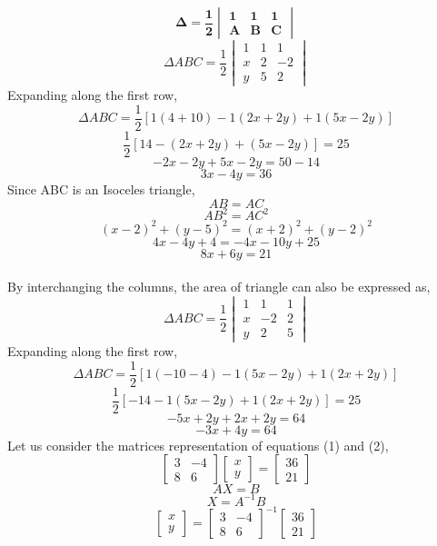 \documentclass[journal,12pt,twocolumn]{IEEEtran}
\begin{document}
$$ \label{eq:area_tri}
\mathbf{\Delta = \frac{1}{2}\begin{vmatrix}
1 & 1 & 1\\ 
A & B & C
\end{vmatrix}}$$
$$\Delta ABC=\frac{1}{2}\begin{vmatrix}
1 & 1 & 1\\ 
x & 2 & -2\\ 
y & 5 & 2
\end{vmatrix}$$
Expanding along the first row,\\
$$\Delta ABC=\frac{1}{2}\left [ 1(4+10)-1(2x+2y)+1(5x-2y) \right ]$$
$$\frac{1}{2}\left [14-(2x+2y)+(5x-2y) \right ]=25$$
$$-2x-2y+5x-2y=50-14$$
\begin{equation}
 3x-4y=36    
\end{equation}
\noindent
Since ABC is an Isoceles triangle,
$$AB=AC$$
$$AB^2=AC^2$$
$$(x-2)^2+(y-5)^2=(x+2)^2+(y-2)^2$$
$$4x-4y+4=-4x-10y+25$$
\begin{equation}
    {8x+6y=21}
\end{equation}\\
By interchanging the columns, the area of triangle can also be expressed as,
$$\Delta ABC=\frac{1}{2}\begin{vmatrix}
1 & 1 & 1\\ 
x & -2 & 2\\ 
y & 2 & 5
\end{vmatrix}$$
Expanding along the first row,\\
$$\Delta ABC=\frac{1}{2}\left [ 1(-10-4)-1(5x-2y)+1(2x+2y) \right ]$$
$$\frac{1}{2}\left [-14-1(5x-2y)+1(2x+2y) \right ]=25$$
$$-5x+2y+2x+2y=64$$
\begin{equation}
 -3x+4y=64    
\end{equation}
Let us consider the matrices representation of equations (1) and (2),
\[
\begin{bmatrix}
3 & -4 \\
8 & 6 
\end{bmatrix}
\begin{bmatrix}
x \\ y
\end{bmatrix}
=
\begin{bmatrix}
36 \\ 21
\end{bmatrix}
\]
$$AX=B$$
$$X= A^{-1}B$$
\[
\begin{bmatrix}
x \\ y
\end{bmatrix}
=
\begin{bmatrix}
3 & -4 \\
8 & 6 
\end{bmatrix}^{-1}
\begin{bmatrix}
36 \\ 21
\end{bmatrix}
\]
\end{document}
